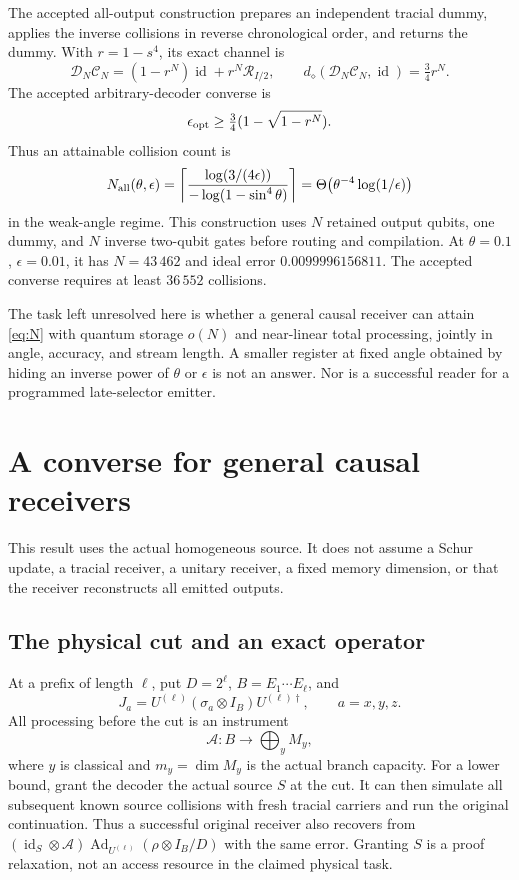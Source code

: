 \documentclass[11pt]{article}
\newcommand{\id}{\operatorname{id}}
\newcommand{\Ad}{\operatorname{Ad}}
\newcommand{\dd}{d_{\diamond}}
\begin{document}
The accepted all-output construction prepares an independent tracial dummy,
applies the inverse collisions in reverse chronological order, and returns the
dummy. With $r=1-s^4$, its exact channel is
\begin{equation}
 \mathcal D_N\mathcal C_N=(1-r^N)\id+r^N\mathcal R_{I/2},
 \qquad \dd(\mathcal D_N\mathcal C_N,\id)=\tfrac34r^N.
 \label{eq:baseline}
\end{equation}
The accepted arbitrary-decoder converse is
\begin{equation}
 \epsilon_{\rm opt}\ge\tfrac34(1-\sqrt{1-r^N}).
 \label{eq:baseline-lower}
\end{equation}
Thus an attainable collision count is
\begin{equation}
 N_{\rm all}(\theta,\epsilon)=
 \left\lceil\frac{\log(3/(4\epsilon))}{-\log(1-\sin^4\theta)}\right\rceil
 =\Theta\!\left(\theta^{-4}\log(1/\epsilon)\right)
 \label{eq:N}
\end{equation}
in the weak-angle regime. This construction uses $N$ retained output qubits,
one dummy, and $N$ inverse two-qubit gates before routing and compilation.
At $\theta=0.1$, $\epsilon=0.01$, it has $N=43\,462$ and ideal error
$0.0099996156811$. The accepted converse requires at least $36\,552$ collisions.

The task left unresolved here is whether a general causal receiver can attain
\eqref{eq:N} with quantum storage $o(N)$ and near-linear total processing,
jointly in angle, accuracy, and stream length. A smaller register at fixed
angle obtained by hiding an inverse power of $\theta$ or $\epsilon$ is not an
answer. Nor is a successful reader for a programmed late-selector emitter.

\section{A converse for general causal receivers}

This result uses the actual homogeneous source. It does not assume a Schur
update, a tracial receiver, a unitary receiver, a fixed memory dimension, or
that the receiver reconstructs all emitted outputs.

\subsection{The physical cut and an exact operator}

At a prefix of length $\ell$, put $D=2^\ell$, $B=E_1\cdots E_\ell$, and
\[
 J_a=U^{(\ell)}(\sigma_a\otimes I_B)U^{(\ell)\dagger},\qquad a=x,y,z.
\]
All processing before the cut is an instrument
\[
 \mathcal A:B\longrightarrow\bigoplus_y M_y,
\]
where $y$ is classical and $m_y=\dim M_y$ is the actual branch capacity.
For a lower bound, grant the decoder the actual source $S$ at the cut. It can
then simulate all subsequent known source collisions with fresh tracial
carriers and run the original continuation. Thus a successful original
receiver also recovers from
$(\id_S\otimes\mathcal A)\Ad_{U^{(\ell)}}(\rho\otimes I_B/D)$ with the
same error. Granting $S$ is a proof relaxation, not an access resource in the
claimed physical task.
\end{document}
